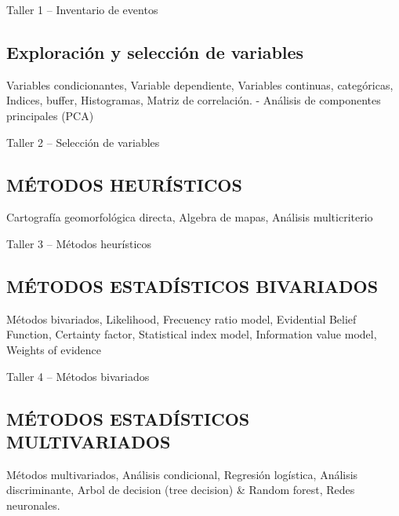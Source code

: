 \documentclass[twoside,11pt,]{article}
\begin{document}
\begin{tcolorbox}[enhanced,width=5in,center upper,  fontupper=\large\bfseries,drop shadow southwest,sharp corners]
Taller 1 -- Inventario de eventos
\end{tcolorbox}

\subsection {Exploración y selección de variables}
Variables condicionantes, Variable dependiente, Variables continuas, categóricas, Indices, buffer, Histogramas, Matriz de correlación.
-	Análisis de componentes principales (PCA)

\begin{tcolorbox}[enhanced,width=5in,center upper,  fontupper=\large\bfseries,drop shadow southwest,sharp corners]
Taller 2 -- Selección de variables
\end{tcolorbox}

\subsection {MÉTODOS HEURÍSTICOS}
Cartografía geomorfológica directa, Algebra de mapas, Análisis multicriterio

\begin{tcolorbox}[enhanced,width=5in,center upper,  fontupper=\large\bfseries,drop shadow southwest,sharp corners]
Taller 3 -- Métodos heurísticos
\end{tcolorbox}

\subsection {MÉTODOS ESTADÍSTICOS BIVARIADOS}
Métodos bivariados, Likelihood, Frecuency ratio model, Evidential Belief Function, Certainty factor, Statistical index model, Information value model, Weights of evidence

\begin{tcolorbox}[enhanced,width=5in,center upper,  fontupper=\large\bfseries,drop shadow southwest,sharp corners]
Taller 4 -- Métodos bivariados
\end{tcolorbox}

\subsection {MÉTODOS ESTADÍSTICOS MULTIVARIADOS}
Métodos multivariados, Análisis condicional, Regresión logística, Análisis discriminante, Arbol de decision (tree decision) \& Random forest, Redes neuronales.
\end{document}
